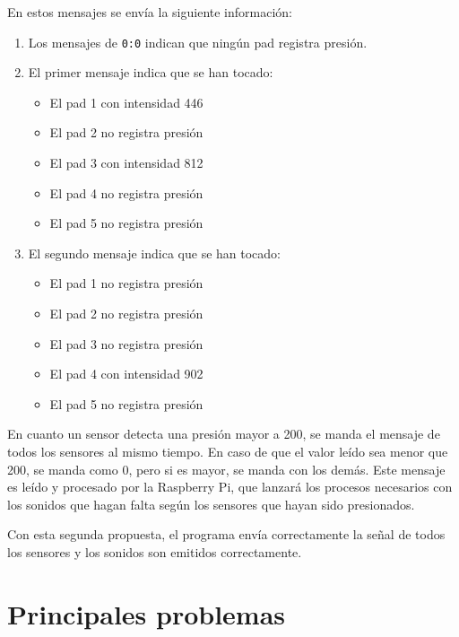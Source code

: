         En estos mensajes se envía la siguiente información:

        \begin{enumerate}
            \item Los mensajes de \texttt{0:0} indican que ningún pad registra presión.
            \item El primer mensaje indica que se han tocado:
            \begin{itemize}
                \item El pad 1 con intensidad 446
                \item El pad 2 no registra presión
                \item El pad 3 con intensidad 812
                \item El pad 4 no registra presión
                \item El pad 5 no registra presión
            \end{itemize}
            \item El segundo mensaje indica que se han tocado:
            \begin{itemize}
                \item El pad 1 no registra presión
                \item El pad 2 no registra presión
                \item El pad 3 no registra presión
                \item El pad 4 con intensidad 902
                \item El pad 5 no registra presión
            \end{itemize}
        \end{enumerate}

        En cuanto un sensor detecta una presión mayor a 200, se manda el mensaje de todos los sensores al mismo tiempo.
        En caso de que el valor leído sea menor que 200, se manda como 0, pero si es mayor, se manda con los demás. Este
        mensaje es leído y procesado por la Raspberry Pi, que lanzará los procesos necesarios con los sonidos que hagan
        falta según los sensores que hayan sido presionados.

        Con esta segunda propuesta, el programa envía correctamente la señal de todos los sensores y los sonidos son
        emitidos correctamente.


    \section{Principales problemas} %
    \label{sec:PrincipalesProblemas}

